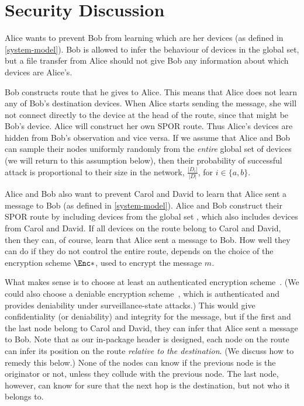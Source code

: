\section{Security Discussion}%
\label{security-discussion}

Alice wants to prevent Bob from learning which are her devices (as defined in 
\cref{system-model}).
Bob is allowed to infer the behaviour of devices in the global set, %
but a file transfer from Alice should not give Bob any information about which 
devices are Alice's.

Bob constructs  route that he gives to Alice.
This means that Alice does not learn any of Bob's destination devices.
When Alice starts sending the message, she will not connect directly to the 
device at the head of the route, since that might be Bob's device.
Alice will construct her own \ac{SPOR} route.
Thus Alice's devices are hidden from Bob's observation and vice versa.
If we assume that Alice and Bob can sample their nodes uniformly randomly from 
the \emph{entire} global set of devices %
(we will return to this assumption 
below), then their probability of successful attack is proportional to their 
size in the network, \ie \(\frac{|D_i|}{|D|}\), for \(i\in \{a,b\}\).

Alice and Bob also want to prevent Carol and David to learn that Alice sent a 
message to Bob (as defined in \cref{system-model}).
Alice and Bob construct their \ac{SPOR} route by including devices from the 
global set %
, which also includes devices from Carol and David.
If all devices on the route belong to Carol and David, then they can, of course, 
learn that Alice sent a message to Bob.
How well they can do if they do not control the entire route, depends on the 
choice of the encryption scheme \(\Enc*\), used to encrypt the message \(m\). 

What makes sense is to choose at least an authenticated encryption 
scheme~\cite{AuthEncryption}.
(We could also choose a deniable encryption scheme~\cite{DeniableEncryption}, 
\eg \cite{OTPKX} which is authenticated and provides deniability under
surveillance-state attacks.) %
This would give confidentiality (or deniability) and integrity for the message, 
but if the first and the last node belong to Carol and David, they can infer 
that Alice sent a message to Bob.
Note that as our in-package header is designed, each node on the route can infer 
its position on the route \emph{relative to the destination}.
(We discuss how to remedy this below.)
None of the nodes can know if the previous node is the originator or not, unless 
they collude with the previous node.
The last node, however, can know for sure that the next hop is the destination, 
but not who it belongs to.

